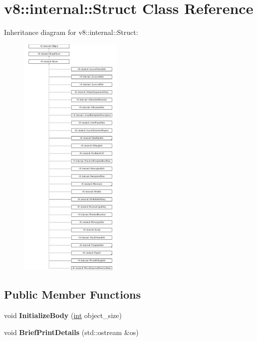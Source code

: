 \hypertarget{classv8_1_1internal_1_1Struct}{}\section{v8\+:\+:internal\+:\+:Struct Class Reference}
\label{classv8_1_1internal_1_1Struct}
Inheritance diagram for v8\+:\+:internal\+:\+:Struct\+:\begin{figure}[H]
\begin{center}
\leavevmode
\includegraphics[height=12.000000cm]{classv8_1_1internal_1_1Struct}
\end{center}
\end{figure}
\subsection*{Public Member Functions}
\begin{DoxyCompactItemize}
\item 
\mbox{\label{classv8_1_1internal_1_1Struct_a301776b4c2188645d8f6bec5093dd85d}} 
void {\bfseries Initialize\+Body} (\mbox{\hyperlink{classint}{int}} object\+\_\+size)
\item 
\mbox{\label{classv8_1_1internal_1_1Struct_a6f2b42bc2d695c91399fd382faa437b8}} 
void {\bfseries Brief\+Print\+Details} (std\+::ostream \&os)
\end{DoxyCompactItemize}
